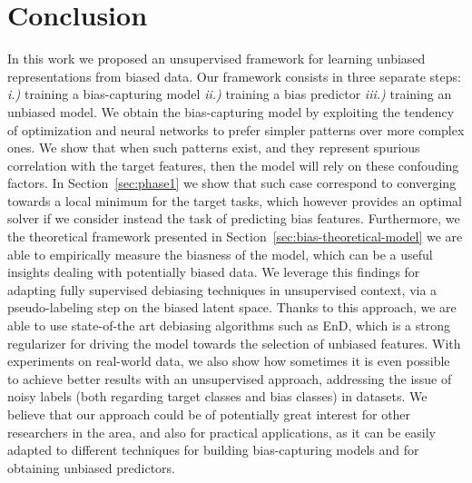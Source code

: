 \section{Conclusion}
\label{sec:conclusion}

In this work we proposed an unsupervised framework for learning unbiased representations from biased data. Our framework consists in three separate steps: \emph{i.)} training a bias-capturing model \emph{ii.)} training a bias predictor \emph{iii.)} training an unbiased model. 
We obtain the bias-capturing model by exploiting the tendency of optimization and neural networks to prefer simpler patterns over more complex ones. We show that when such patterns exist, and they represent spurious correlation with the target features, then the model will rely on these confouding factors. 
In Section~\ref{sec:phase1} we show that such case correspond to converging towards a local minimum for the target tasks, which however provides an optimal solver if we consider instead the task of predicting bias features. Furthermore, we the theoretical framework presented in Section~\ref{sec:bias-theoretical-model} we are able to empirically measure the biasness of the model, which can be a useful insights dealing with potentially biased data. We leverage this findings for adapting fully supervised debiasing techniques in unsupervised context, via a pseudo-labeling step on the biased latent space. Thanks to this approach, we are able to use state-of-the art debiasing algorithms such as EnD, which is a strong regularizer for driving the model towards the selection of unbiased features. With experiments on real-world data, we also show how sometimes it is even possible to achieve better results with an unsupervised approach, addressing the issue of noisy labels (both regarding target classes and bias classes) in datasets.
We believe that our approach could be of potentially great interest for other researchers in the area, and also for practical applications, as it can be easily adapted to different techniques for building bias-capturing models and for obtaining unbiased predictors.

